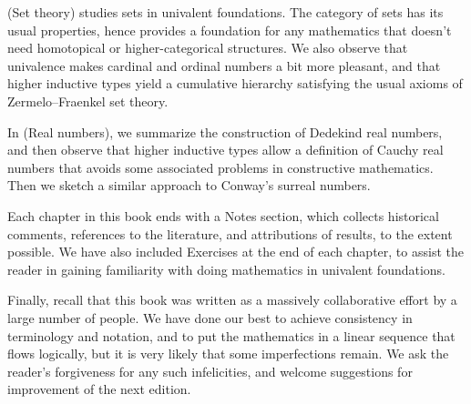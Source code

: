 \documentclass[12pt]{article}
\begin{document}
 (Set theory) studies sets in univalent foundations.
The category of sets has its usual properties, hence provides a foundation for any mathematics that doesn't need homotopical or higher-categorical structures.
We also observe that univalence makes cardinal and ordinal numbers a bit more pleasant, and that higher inductive types yield a cumulative hierarchy satisfying the usual axioms of Zermelo--Fraenkel set theory.

In  (Real numbers), we summarize the construction of Dedekind real numbers, and then observe that higher inductive types allow a definition of Cauchy real numbers that avoids some associated problems in constructive mathematics.
Then we sketch a similar approach to Conway's surreal numbers.

Each chapter in this book ends with a Notes section, which collects historical comments, references to the literature, and attributions of results, to the extent possible.
We have also included Exercises at the end of each chapter, to assist the reader in gaining familiarity with doing mathematics in univalent foundations.

Finally, recall that this book was written as a massively collaborative effort by a large number of people.
We have done our best to achieve consistency in terminology and notation, and to put the mathematics in a linear sequence that flows logically, but it is very likely that some imperfections remain.
We ask the reader's forgiveness for any such infelicities, and welcome suggestions for improvement of the next edition.


\begin{thebibliography}{99}

\end{thebibliography}
\end{document}
